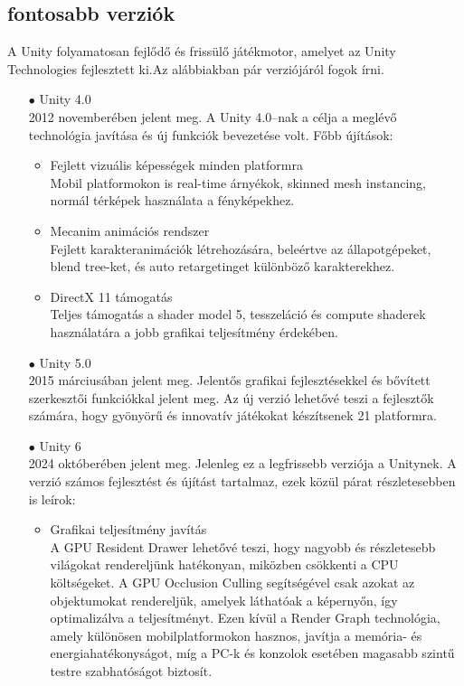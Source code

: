 \documentclass[
]{thesis-ekf}
\theoremstyle{definition}
\theoremstyle{remark}
\begin{document}
\subsection{fontosabb verziók}
A Unity folyamatosan fejlődő és frissülő játékmotor, amelyet az Unity Technologies fejlesztett ki.Az alábbiakban pár verziójáról fogok írni.
\begin{itemize}
	\item[$\bullet$]Unity 4.0\\2012 novemberében jelent meg. A Unity 4.0--nak a célja a meglévő technológia javítása és új funkciók bevezetése volt. Főbb újítások:
	\begin{itemize}
		\item Fejlett vizuális képességek minden platformra\\Mobil platformokon is real-time árnyékok, skinned mesh instancing, normál térképek használata a fényképekhez.
		\item Mecanim animációs rendszer \\ Fejlett karakteranimációk létrehozására, beleértve az állapotgépeket, blend tree-ket, és auto retargetinget különböző karakterekhez.
		\item DirectX 11 támogatás \\ Teljes támogatás a shader model 5, tesszeláció és compute shaderek használatára a jobb grafikai teljesítmény érdekében.\cite{Unity4.0}
	\end{itemize}
	\item[$\bullet$]Unity 5.0\\2015 márciusában jelent meg. Jelentős grafikai fejlesztésekkel és bővített szerkesztői funkciókkal jelent meg. Az új verzió lehetővé teszi a fejlesztők számára, hogy gyönyörű és innovatív játékokat készítsenek 21 platformra.\cite{Unity5.0}
	\item[$\bullet$]Unity 6\\2024 októberében jelent meg. Jelenleg ez a legfrissebb verziója a Unitynek. A verzió számos fejlesztést és újítást tartalmaz, ezek közül párat részletesebben is leírok:
	\begin{itemize}
		\item Grafikai teljesítmény javítás \\A GPU Resident Drawer lehetővé teszi, hogy nagyobb és részletesebb világokat rendereljünk hatékonyan, miközben csökkenti a CPU költségeket. A GPU Occlusion Culling segítségével csak azokat az objektumokat rendereljük, amelyek láthatóak a képernyőn, így optimalizálva a teljesítményt. Ezen kívül a Render Graph technológia, amely különösen mobilplatformokon hasznos, javítja a memória- és energiahatékonyságot, míg a PC-k és konzolok esetében magasabb szintű testre szabhatóságot biztosít.

\end{itemize}
\end{itemize}
\end{document}
